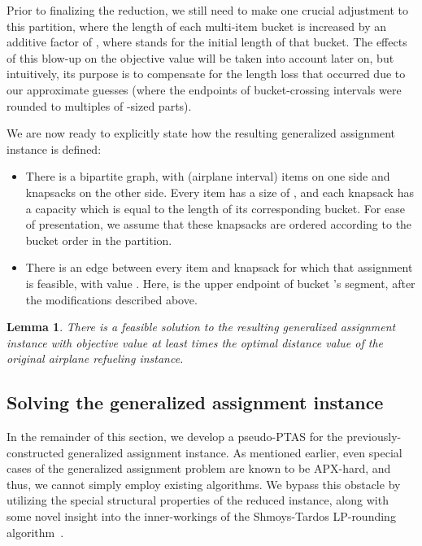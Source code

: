 \documentclass[11pt]{article}
\theoremstyle{plain}
\newtheorem{lemma}[theorem]{Lemma}
\theoremstyle{definition}
\begin{document}
Prior to finalizing the reduction, we still need to make one crucial adjustment to this partition, where the length of each multi-item bucket is increased by an additive factor of , where  stands for the initial length of that bucket. The effects of this blow-up on the objective value will be taken into account later on, but intuitively, its purpose is to compensate for the length loss that occurred due to our approximate guesses (where the endpoints of bucket-crossing intervals were rounded to multiples of -sized parts).

\smallskip {} We are now ready to explicitly state how the resulting generalized assignment instance is defined:
\begin{itemize}
\item There is a bipartite graph, with  (airplane interval) items on one side and  knapsacks on the other side. Every item  has a size of , and each knapsack  has a capacity which is equal to the length of its corresponding bucket. For ease of presentation, we assume that these knapsacks are ordered according to the bucket order in the partition.

\item There is an edge between every item  and knapsack  for which that assignment is feasible, with value . Here,  is the upper endpoint of bucket 's segment, after the modifications described above.
\end{itemize}

\begin{lemma} \label{lemma:ptas_reduction}
There is a feasible solution to the resulting generalized assignment instance with objective value at least   times the optimal distance value of the original airplane refueling instance.
\end{lemma}

\subsection{Solving the generalized assignment instance} \label{subsec:solve_generalized_assign}

In the remainder of this section, we develop a pseudo-PTAS for the previously-constructed generalized assignment instance. As mentioned earlier, even special cases of the generalized assignment problem are known to be APX-hard, and thus, we cannot simply employ existing algorithms. We bypass this obstacle by utilizing the special structural properties of the reduced instance, along with some novel insight into the inner-workings of the Shmoys-Tardos LP-rounding algorithm~\cite{ShmoysT93}.
\end{document}
